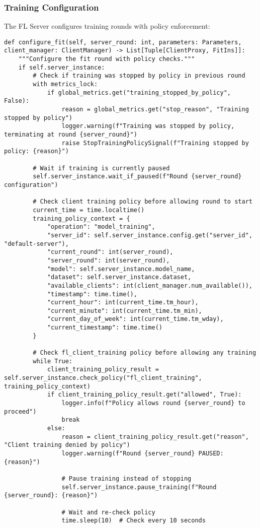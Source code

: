 \subsubsection{Training Configuration}

The FL Server configures training rounds with policy enforcement:

\begin{lstlisting}[style=pythoncode, caption=FL Server Training Configuration]
def configure_fit(self, server_round: int, parameters: Parameters, client_manager: ClientManager) -> List[Tuple[ClientProxy, FitIns]]:
    """Configure the fit round with policy checks."""
    if self.server_instance:
        # Check if training was stopped by policy in previous round
        with metrics_lock:
            if global_metrics.get("training_stopped_by_policy", False):
                reason = global_metrics.get("stop_reason", "Training stopped by policy")
                logger.warning(f"Training was stopped by policy, terminating at round {server_round}")
                raise StopTrainingPolicySignal(f"Training stopped by policy: {reason}")
        
        # Wait if training is currently paused
        self.server_instance.wait_if_paused(f"Round {server_round} configuration")
        
        # Check client training policy before allowing round to start
        current_time = time.localtime()
        training_policy_context = {
            "operation": "model_training",
            "server_id": self.server_instance.config.get("server_id", "default-server"),
            "current_round": int(server_round),
            "server_round": int(server_round),
            "model": self.server_instance.model_name,
            "dataset": self.server_instance.dataset,
            "available_clients": int(client_manager.num_available()),
            "timestamp": time.time(),
            "current_hour": int(current_time.tm_hour),
            "current_minute": int(current_time.tm_min),
            "current_day_of_week": int(current_time.tm_wday),
            "current_timestamp": time.time()
        }
        
        # Check fl_client_training policy before allowing any training
        while True:
            client_training_policy_result = self.server_instance.check_policy("fl_client_training", training_policy_context)
            if client_training_policy_result.get("allowed", True):
                logger.info(f"Policy allows round {server_round} to proceed")
                break
            else:
                reason = client_training_policy_result.get("reason", "Client training denied by policy")
                logger.warning(f"Round {server_round} PAUSED: {reason}")
                
                # Pause training instead of stopping
                self.server_instance.pause_training(f"Round {server_round}: {reason}")
                
                # Wait and re-check policy
                time.sleep(10)  # Check every 10 seconds
\end{lstlisting}


